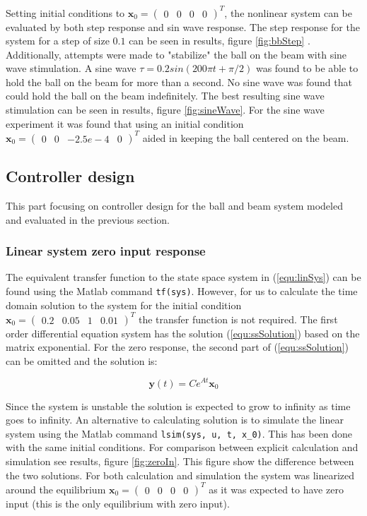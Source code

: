 \documentclass[a4paper, titlepage]{article}
\begin{document}
Setting initial conditions to $\textbf{x}_0 = \begin{pmatrix} 0 & 0 & 0 & 0 \end{pmatrix}^T$, the nonlinear system can be evaluated by both step response and sin wave response.
The step response for the system for a step of size $0.1$ can be seen in results, figure \ref{fig:bbStep}	.
Additionally, attempts were made to "stabilize" the ball on the beam with sine wave stimulation.
A sine wave $\tau = 0.2sin(200\pi t + \pi/2)$ was found to be able to hold the ball on the beam for more than a second.
No sine wave was found that could hold the ball on the beam indefinitely. 
The best resulting sine wave stimulation can be seen in results, figure \ref{fig:sineWave}.
For the sine wave experiment it was found that using an initial condition $\textbf{x}_0 = \begin{pmatrix} 0 & 0 & -2.5e-4 & 0 \end{pmatrix}^T$ aided in keeping the ball centered on the beam.

\subsection{Controller design}
This part focusing on controller design for the ball and beam system modeled and evaluated in the previous section.

\subsubsection{Linear system zero input response}
The equivalent transfer function to the state space system in (\ref{equ:linSys}) can be found using the Matlab command \verb|tf(sys)|.
However, for us to calculate the time domain solution to the system for the initial condition $\textbf{x}_0 = \begin{pmatrix} 0.2 & 0.05 & 1 & 0.01	 \end{pmatrix}^T$ the transfer function is not required.
The first order differential equation system has the solution (\ref{equ:ssSolution}) based on the matrix exponential.
For the zero response, the second part of (\ref{equ:ssSolution}) can be omitted and the solution is:

\begin{equation}
\textbf{y}(t) = Ce^{At}\textbf{x}_0
\end{equation}

Since the system is unstable the solution is expected to grow to infinity as time goes to infinity.
An alternative to calculating solution is to simulate the linear system using the Matlab command \verb|lsim(sys, u, t, x_0)|.
This has been done with the same initial conditions.
For comparison between explicit calculation and simulation see results, figure \ref{fig:zeroIn}.
This figure show the difference between the two solutions.
For both calculation and simulation the system was linearized around the equilibrium $\textbf{x}_0 = \begin{pmatrix} 0 & 0 & 0 & 0 \end{pmatrix}^T$ as it was expected to have zero input (this is the only equilibrium with zero input).
\end{document}
